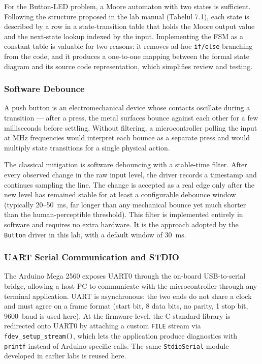 For the Button-LED problem, a Moore automaton with two states is sufficient. Following the structure proposed in the lab manual (Tabelul 7.1), each state is described by a row in a state-transition table that holds the Moore output value and the next-state lookup indexed by the input. Implementing the FSM as a constant table is valuable for two reasons: it removes ad-hoc \texttt{if/else} branching from the code, and it produces a one-to-one mapping between the formal state diagram and its source code representation, which simplifies review and testing.

\subsubsection{Software Debounce}

A push button is an electromechanical device whose contacts oscillate during a transition --- after a press, the metal surfaces bounce against each other for a few milliseconds before settling. Without filtering, a microcontroller polling the input at MHz frequencies would interpret each bounce as a separate press and would multiply state transitions for a single physical action.

The classical mitigation is software debouncing with a stable-time filter. After every observed change in the raw input level, the driver records a timestamp and continues sampling the line. The change is accepted as a real edge only after the new level has remained stable for at least a configurable debounce window (typically 20--50~ms, far longer than any mechanical bounce yet much shorter than the human-perceptible threshold). This filter is implemented entirely in software and requires no extra hardware. It is the approach adopted by the \texttt{Button} driver in this lab, with a default window of 30~ms.

\subsubsection{UART Serial Communication and STDIO}

The Arduino Mega 2560 exposes UART0 through the on-board USB-to-serial bridge, allowing a host PC to communicate with the microcontroller through any terminal application. UART is asynchronous: the two ends do not share a clock and must agree on a frame format (start bit, 8 data bits, no parity, 1 stop bit, 9600~baud is used here). At the firmware level, the C standard library is redirected onto UART0 by attaching a custom \texttt{FILE} stream via \texttt{fdev\_setup\_stream()}, which lets the application produce diagnostics with \texttt{printf} instead of Arduino-specific calls. The same \texttt{StdioSerial} module developed in earlier labs is reused here.

